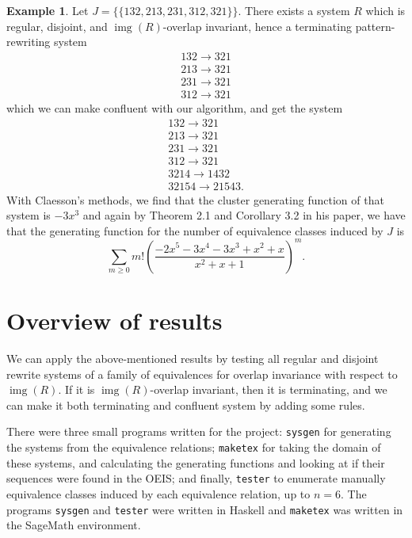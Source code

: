 \documentclass[a4paper, 11pt, english]{article}
\newcommand{\patternrule}{ \to \!}
\theoremstyle{definition}
\newtheorem{example}[theorem]{Example}
\DeclareMathOperator{\img}{img}
\begin{document}
\begin{example}

Let $J = \{ \{ 132, 213, 231, 312, 321 \} \}$. There exists a system $R$ which is regular,
disjoint, and $\img(R)$-overlap invariant, hence a terminating pattern-rewriting system
\[
    \begin{matrix}
      132 \patternrule 321 \\
      213 \patternrule 321 \\
      231 \patternrule 321 \\
      312 \patternrule 321
    \end{matrix}
\]
which we can make confluent with our algorithm, and get the system
\[
    \begin{matrix}
      132 \patternrule 321 \\
      213 \patternrule 321 \\
      231 \patternrule 321 \\
      312 \patternrule 321 \\
      3214 \patternrule 1432 \\
      32154 \patternrule 21543.
    \end{matrix}
\]
With Claesson's methods, we find that the cluster generating function of that system is $-3x^3$ and
again by Theorem 2.1 and Corollary 3.2 in his paper, we have that the generating function for the
number of equivalence classes induced by $J$ is
\[
  \sum_{m \geq 0} m! \left( \frac{-2x^5-3x^4-3x^3+x^2+x}{x^2+x+1} \right)^m.
\]

\end{example}

\section{Overview of results}
We can apply the above-mentioned results by testing all regular and disjoint rewrite systems of a
family of equivalences for overlap invariance with respect to $\img(R)$. If it is $\img(R)$-overlap
invariant,
then it is terminating, and we can make it both terminating and confluent system by adding some rules.

There were three small programs \cite{hartjenstein:2021} written for the project: \verb|sysgen| for
generating the systems from the equivalence relations; \verb|maketex| for taking the domain of these
systems, and calculating the generating functions and looking at if their sequences were found in
the OEIS; and finally, \verb|tester| to enumerate manually equivalence classes induced by each
equivalence relation, up to $n=6$. The programs \verb|sysgen| and \verb|tester| were written in
Haskell and \verb|maketex| was written in the SageMath environment. 
\end{document}
